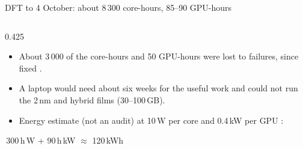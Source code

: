 \begin{frame}[t]{DFT to 4 October: about 8\,300 core-hours, 85--90 GPU-hours}
\begin{columns}[T,onlytextwidth]
\begin{column}{0.425\textwidth}
\begin{itemize}
          .
        \item About 3\,000 of the core-hours and 50 GPU-hours were lost to failures, since fixed .
        \item A laptop would need about six weeks for the useful work  and could not run the 2\,nm
          and hybrid films (30--100\,GB).
        \item Energy estimate (not an audit) at 10\,W per core and 0.4\,kW per GPU :
      \end{itemize}
      \vspace{0.3mm}
      {\footnotesize{}\,300\,h\,W + 90\,h\,kW $\approx$ 120\,kWh\par}
    \end{column}
  \end{columns}
\end{frame}

